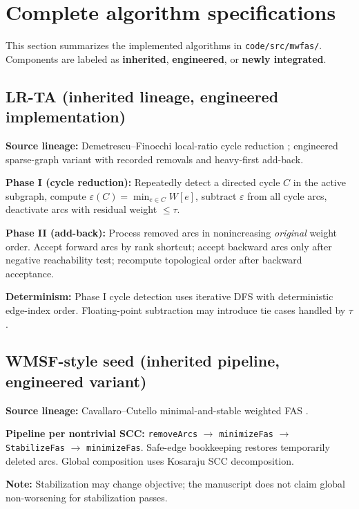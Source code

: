 \section{Complete algorithm specifications}
\label{sec:or1-algorithms}

This section summarizes the implemented algorithms in \texttt{code/src/mwfas/}. Components are labeled as \textbf{inherited}, \textbf{engineered}, or \textbf{newly integrated}.



\subsection{LR-TA (inherited lineage, engineered implementation)}

\textbf{Source lineage:} Demetrescu--Finocchi local-ratio cycle reduction \cite{DF03}; engineered sparse-graph variant with recorded removals and heavy-first add-back.

\textbf{Phase I (cycle reduction):} Repeatedly detect a directed cycle $C$ in the active subgraph, compute $\varepsilon(C)=\min_{e\in C}W[e]$, subtract $\varepsilon$ from all cycle arcs, deactivate arcs with residual weight $\le\tau$.

\textbf{Phase II (add-back):} Process removed arcs in nonincreasing \emph{original} weight order. Accept forward arcs by rank shortcut; accept backward arcs only after negative reachability test; recompute topological order after backward acceptance.

\textbf{Determinism:} Phase I cycle detection uses iterative DFS with deterministic edge-index order. Floating-point subtraction may introduce tie cases handled by $\tau$.

\subsection{WMSF-style seed (inherited pipeline, engineered variant)}

\textbf{Source lineage:} Cavallaro--Cutello minimal-and-stable weighted FAS \cite{CC25}.

\textbf{Pipeline per nontrivial SCC:} \texttt{removeArcs} $\rightarrow$ \texttt{minimizeFas} $\rightarrow$ \texttt{StabilizeFas} $\rightarrow$ \texttt{minimizeFas}. Safe-edge bookkeeping restores temporarily deleted arcs. Global composition uses Kosaraju SCC decomposition.

\textbf{Note:} Stabilization may change objective; the manuscript does not claim global non-worsening for stabilization passes.

